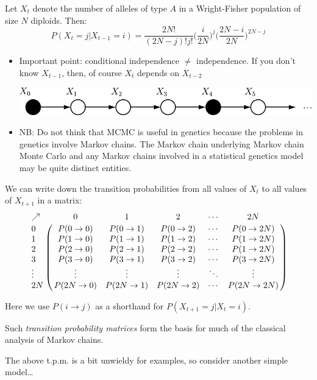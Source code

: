 Let $X_t$ denote the number of alleles of type $A$ in a Wright-Fisher population of size $N$ diploids.  Then:
\[
P(X_t=j|X_{t-1}=i) = \frac{2N!}{(2N-j)!j!} \biggl({\textstyle \frac{i}{2N}}\biggr)^j
\biggl({\textstyle \frac{2N-i}{2N}}\biggr)^{2N-j}
\]
\begin{itemize}
\item Important point:  conditional independence $\neq$ independence.  If you don't know $X_{t-1}$, then, of course $X_{t}$ depends on $X_{t-2}$
\begin{center}
\includegraphics[width=.92\textwidth]{illus/mcdag_cond.pdf}
\end{center}

\item NB: Do not think that MCMC is useful in genetics because the problems in genetics involve Markov chains.  The Markov chain underlying Markov chain Monte Carlo and any Markov chains involved in a statistical genetics model may be quite distinct entities.  
\end{itemize}
   

We can write down the transition probabilities from all values of $X_t$ to all values of $X_{t+1}$ in a matrix:  {\small
\[
	\bordermatrix{
  \nearrow &0   &   1&   2  & \cdots & 2N \cr
 0 &
	P(0\rightarrow 0) &
	 P(0\rightarrow 1) &
	 	 P(0\rightarrow 2) &
		 	\cdots &
			 	  P(0\rightarrow 2N) \cr
 1 &
	P(1\rightarrow 0) &
	 P(1\rightarrow 1) &
	 	 P(1\rightarrow 2) &
		 	 \cdots &
			 	  P(1\rightarrow 2N) \cr
2 &
	P(2\rightarrow 0) &
	 P(2\rightarrow 1) &
	 	 P(2\rightarrow 2) &
		 	 \cdots &
			 	  P(1\rightarrow 2N) \cr
3 &
	P(3\rightarrow 0) &
	 P(3\rightarrow 1) &
	 	 P(3\rightarrow 2) &
		 	 \cdots &
			 	  P(3\rightarrow 2N) \cr
\vdots & \vdots & \vdots &\vdots &\ddots & \vdots \cr
2N &
	P(2N\rightarrow 0) &
	 P(2N\rightarrow 1) &
	 	 P(2N\rightarrow 2) &
		 	 \cdots &
			 	  P(2N\rightarrow 2N) \cr
}
\]
}

Here we use $P(i\rightarrow j)$ as a shorthand for $P(X_{t+1}=j|X_t=i)$.

Such {\sl transition probability matrices} form the basis for much of the classical analysis of Markov chains.

The above t.p.m. is a bit unwieldy for examples, so consider another simple model\ldots

